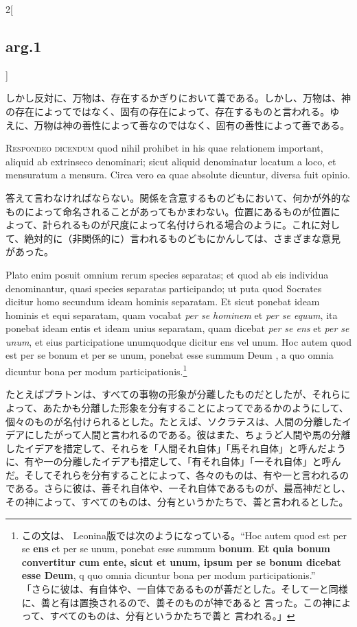 \documentclass[paper=a4paper,fontsize=10pt,jafontsize=9pt,titlepage]{jlreq}
\begin{document}
\begin{paracol}{2}[\subsection{arg.1}]
\switchcolumn

しかし反対に、万物は、存在するかぎりにおいて善である。しかし、万物は、神
 の存在によってではなく、固有の存在によって、存在するものと言われる。ゆ
 えに、万物は神の善性によって善なのではなく、固有の善性によって善である。


{\scshape Respondeo dicendum} quod nihil prohibet in his quae relationem
 important, aliquid ab extrinseco denominari; sicut aliquid denominatur
 locatum a loco, et mensuratum a mensura.  Circa vero ea quae absolute
 dicuntur, diversa fuit opinio.

\switchcolumn

答えて言わなければならない。関係を含意するものどもにおいて、何かが外的な
 ものによって命名されることがあってもかまわない。位置にあるものが位置に
 よって、計られるものが尺度によって名付けられる場合のように。これに対し
 て、絶対的に（非関係的に）言われるものどもにかんしては、さまざまな意見
 があった。

\switchcolumn*

Plato enim posuit omnium rerum species separatas; et quod ab eis
 individua denominantur, quasi species separatas participando; ut puta
 quod Socrates dicitur homo secundum ideam hominis separatam. Et sicut
 ponebat ideam hominis et equi separatam, quam vocabat {\itshape per se
 hominem} et {\itshape per se equum}, ita ponebat ideam entis et ideam
 unius separatam, quam dicebat {\itshape per se ens} et {\itshape per se
 unum}, et eius participatione unumquodque dicitur ens vel unum. Hoc
 autem quod est per se bonum et per se unum, ponebat esse summum Deum ,
 a quo omnia dicuntur bona per modum participationis.\footnote{この文は、
 Leonina版では次のようになっている。``Hoc autem quod est per se
 {\bfseries ens} et per se unum, ponebat esse summum {\bfseries
 bonum}. {\bfseries Et quia bonum convertitur cum ente, sicut et unum,
 ipsum per se bonum dicebat esse Deum}, q quo omnia dicuntur bona per
 modum participationis.''\\「さらに彼は、有自体や、一自体であるものが善だとした。そして一と同様に、善と有は置換されるので、善そのものが神であると
 言った。この神によって、すべてのものは、分有というかたちで善と
 言われる。」}

\switchcolumn

たとえばプラトンは、すべての事物の形象が分離したものだとしたが、それらに
 よって、あたかも分離した形象を分有することによってであるかのようにして、
 個々のものが名付けられるとした。たとえば、ソクラテスは、人間の分離したイ
 デアにしたがって人間と言われるのである。彼はまた、ちょうど人間や馬の分離
 したイデアを措定して、それらを「人間それ自体」「馬それ自体」と呼んだよう
 に、有や一の分離したイデアも措定して、「有それ自体」「一それ自体」と呼ん
 だ。そしてそれらを分有することによって、各々のものは、有や一と言われるの
 である。さらに彼は、善それ自体や、一それ自体であるものが、最高神だとし、
 その神によって、すべてのものは、分有というかたちで、善と言われるとした。


\end{paracol}
\end{document}
